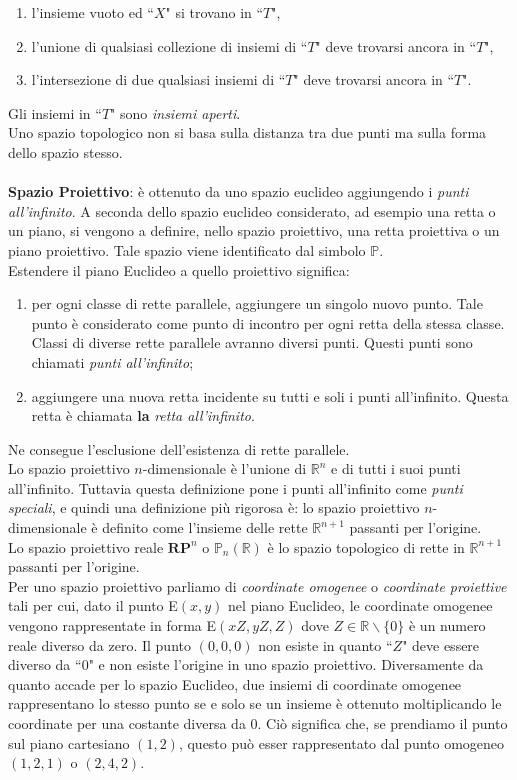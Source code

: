 \documentclass[a4paper,12pt]{tesiinfo}
\begin{document}
\begin{enumerate}
    \item l'insieme vuoto ed ``$X$" si trovano in ``$T$",
    \item l'unione di qualsiasi collezione di insiemi di ``$T$" deve trovarsi ancora in ``$T$",
    \item l'intersezione di due qualsiasi insiemi di ``$T$" deve trovarsi ancora in ``$T$".
\end{enumerate}
Gli insiemi in ``$T$" sono \textit{insiemi aperti}.
\\
Uno spazio topologico non si basa sulla distanza tra due punti ma sulla forma dello spazio stesso.
\\\\
%
%
%
\textbf{Spazio Proiettivo}: \`e ottenuto da uno spazio euclideo aggiungendo i \textit{punti all'infinito}. A seconda dello spazio euclideo considerato, ad esempio una retta o un piano, si vengono a definire, nello spazio proiettivo, una retta proiettiva o un piano proiettivo. Tale spazio viene identificato dal simbolo $\mathbb{P}$.
\\
Estendere il piano Euclideo a quello proiettivo significa:
\begin{enumerate}
    \item per ogni classe di rette parallele, aggiungere un singolo nuovo punto. Tale punto \`e considerato come punto di incontro per ogni retta della stessa classe. Classi di diverse rette parallele avranno diversi punti. Questi punti sono chiamati \textit{punti all'infinito};
    \item aggiungere una nuova retta incidente su tutti e soli i punti all'infinito. Questa retta \`e chiamata \textbf{la} \textit{retta all'infinito}.
\end{enumerate}
Ne consegue l'esclusione dell'esistenza di rette parallele.
\\
Lo spazio proiettivo $n$-dimensionale \`e l'unione di $\mathbb{R}^n$ e di tutti i suoi punti all'infinito. Tuttavia questa definizione pone i punti all'infinito come \textit{punti speciali}, e quindi una definizione pi\`u rigorosa \`e: lo spazio proiettivo $n$-dimensionale \`e definito come l'insieme delle rette $\mathbb{R}^ {n+1}$ passanti per l'origine.
\\
Lo spazio proiettivo reale $\textbf{RP}^n$ o $\mathbb{P}_n(\mathbb{R})$ \`e lo spazio topologico di rette in $\mathbb{R}^ {n+1}$ passanti per l'origine.
\\
Per uno spazio proiettivo parliamo di \textit{coordinate omogenee} o \textit{coordinate proiettive} tali per cui, dato il punto E$(x, y)$ nel piano Euclideo, le coordinate omogenee vengono rappresentate in forma E$(xZ, yZ, Z)$ dove $Z \in \mathbb{R} \backslash \{0\}$ \`e un numero reale diverso da zero. Il punto $(0, 0, 0)$ non esiste in quanto ``$Z$" deve essere diverso da ``$0$" e non esiste l'origine in uno spazio proiettivo. Diversamente da quanto accade per lo spazio Euclideo, due insiemi di coordinate omogenee rappresentano lo stesso punto se e solo se un insieme \`e ottenuto moltiplicando le coordinate per una costante diversa da 0. Ci\`o significa che, se prendiamo il punto sul piano cartesiano $(1, 2)$, questo pu\`o esser rappresentato dal punto omogeneo $(1, 2, 1)$ o $(2, 4, 2)$.\\
\end{document}

